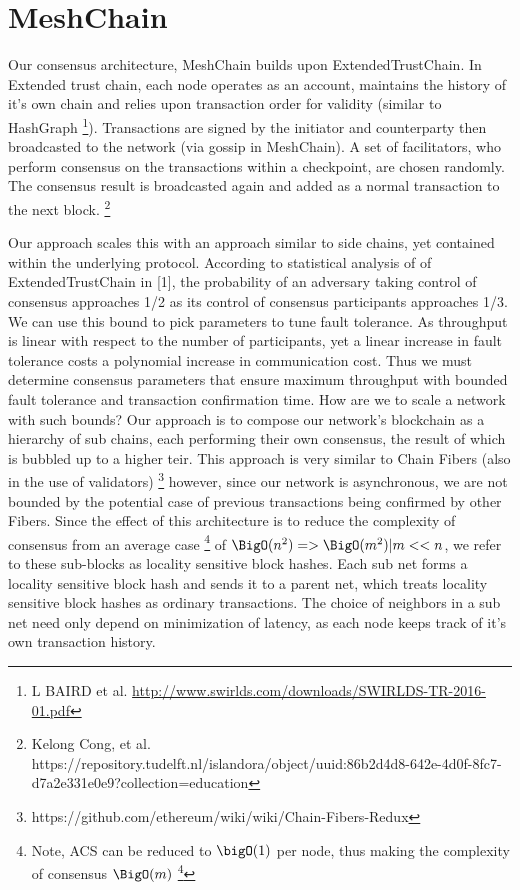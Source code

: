 \documentclass{article}
\begin{document}
\section{MeshChain}
Our consensus architecture, MeshChain builds upon ExtendedTrustChain. In Extended trust chain, each node operates as an account, maintains the history of it's own chain and relies upon transaction order for validity (similar to HashGraph \footnote{ 
L BAIRD et al. \url{http://www.swirlds.com/downloads/SWIRLDS-TR-2016-01.pdf}}). Transactions are signed by the initiator and counterparty then broadcasted to the network (via gossip in MeshChain). A set of facilitators, who perform consensus on the transactions within a checkpoint, are chosen randomly. The consensus result is broadcasted again and added as a normal transaction to the next block. \footnote{Kelong Cong, et al. https://repository.tudelft.nl/islandora/object/uuid:86b2d4d8-642e-4d0f-8fc7-d7a2e331e0e9?collection=education} 

Our approach scales this with an approach similar to side chains, yet contained within the underlying protocol. According to statistical analysis of of ExtendedTrustChain in [1], the probability of an adversary taking control of consensus approaches 1/2 as its control of consensus participants approaches 1/3. We can use this bound to pick parameters to tune fault tolerance. As throughput is linear with respect to the number of participants, yet a linear increase in fault tolerance costs a polynomial increase in communication cost. Thus we must determine consensus parameters that ensure maximum throughput with bounded fault tolerance and transaction confirmation time. How are we to scale a network with such bounds? Our approach is to compose our network's blockchain as a hierarchy of sub chains, each performing their own consensus, the result of which is bubbled up to a higher teir. This approach is very similar to Chain Fibers (also in the use of validators) \footnote{https://github.com/ethereum/wiki/wiki/Chain-Fibers-Redux} however, since our network is asynchronous, we are not bounded by the potential case of previous transactions being confirmed by other Fibers. Since the effect of this architecture is to reduce the complexity of consensus from an average case \footnote{Note, ACS can be reduced to $\bigO (1)$ per node, thus making the complexity of consensus $\BigO (m)$ \footnote{"The Honey Badger of BFT Protocols": Andrew Miller et al. \url{https://eprint.iacr.org/2016/199}}} of $\BigO (n^2) => \BigO (m^2) | m << n$, we refer to these sub-blocks as locality sensitive block hashes. Each sub net forms a locality sensitive block hash and sends it to a parent net, which treats locality sensitive block hashes as ordinary transactions. The choice of neighbors in a sub net need only depend on minimization of latency, as each node keeps track of it's own transaction history.
\end{document}
